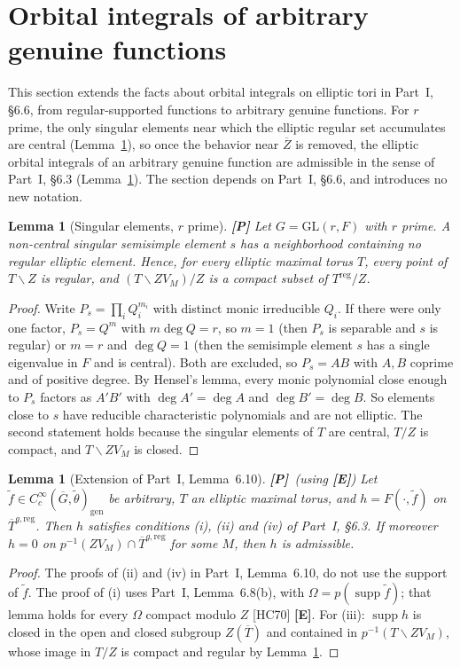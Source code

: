 \documentclass[12pt]{article}
\newcommand{\ov}[1]{\overline{#1}}
\newcommand{\gen}{\mathrm{gen}}
\newcommand{\reg}{\mathrm{reg}}
\newcommand{\supp}{\operatorname{supp}}
\newcommand{\GL}{\mathrm{GL}}
\newcommand{\Gb}{\ov{G}}
\newcommand{\Zb}{\ov{Z}}
\newcommand{\Tb}{\ov{T}}
\newcommand{\Pv}{\textbf{[P]}}
\newcommand{\Ev}{\textbf{[E]}}
\theoremstyle{plain}
\newtheorem{lemma}[theorem]{Lemma}
\theoremstyle{definition}
\begin{document}
\section{Orbital integrals of arbitrary genuine functions}\label{sec:arbitrary}
This section extends the facts about orbital integrals on elliptic tori in Part~I, \S6.6, from regular-supported functions to arbitrary genuine functions. For $r$ prime, the only singular elements near which the elliptic regular set accumulates are central (Lemma~\ref{lem:singular}), so once the behavior near $\Zb$ is removed, the elliptic orbital integrals of an arbitrary genuine function are admissible in the sense of Part~I, \S6.3 (Lemma~\ref{lem:Aext}). The section depends on Part~I, \S6.6, and introduces no new notation.

\begin{lemma}[Singular elements, $r$ prime]\label{lem:singular}\Pv
Let $G=\GL(r,F)$ with $r$ prime. A non-central singular semisimple element $s$ has a neighborhood containing no regular elliptic element. Hence, for every elliptic maximal torus $T$, every point of $T\smallsetminus Z$ is regular, and $(T\smallsetminus ZV_M)/Z$ is a compact subset of $T^{\reg}/Z$.
\end{lemma}
\begin{proof}
Write $P_s=\prod_iQ_i^{m_i}$ with distinct monic irreducible $Q_i$. If there were only one factor, $P_s=Q^m$ with $m\deg Q=r$, so $m=1$ (then $P_s$ is separable and $s$ is regular) or $m=r$ and $\deg Q=1$ (then the semisimple element $s$ has a single eigenvalue in $F$ and is central). Both are excluded, so $P_s=AB$ with $A,B$ coprime and of positive degree. By Hensel's lemma, every monic polynomial close enough to $P_s$ factors as $A'B'$ with $\deg A'=\deg A$ and $\deg B'=\deg B$. So elements close to $s$ have reducible characteristic polynomials and are not elliptic. The second statement holds because the singular elements of $T$ are central, $T/Z$ is compact, and $T\smallsetminus ZV_M$ is closed.
\end{proof}

\begin{lemma}[Extension of Part~I, Lemma~6.10]\label{lem:Aext}\Pv\ (using \Ev)
Let $\tilde f\in C_c^\infty(\Gb,\tilde\theta)_\gen$ be arbitrary, $T$ an elliptic maximal torus, and $h=F(\cdot,\tilde f)$ on $\Tb^{g,\reg}$. Then $h$ satisfies conditions (i), (ii) and (iv) of Part~I, \S6.3. If moreover $h=0$ on $p^{-1}(ZV_M)\cap\Tb^{g,\reg}$ for some $M$, then $h$ is admissible.
\end{lemma}
\begin{proof}
The proofs of (ii) and (iv) in Part~I, Lemma~6.10, do not use the support of $\tilde f$. The proof of (i) uses Part~I, Lemma~6.8(b), with $\Omega=p(\supp\tilde f)$; that lemma holds for every $\Omega$ compact modulo $Z$ [HC70] \Ev. For (iii): $\supp h$ is closed in the open and closed subgroup $Z(\Tb)$ and contained in $p^{-1}(T\smallsetminus ZV_M)$, whose image in $T/Z$ is compact and regular by Lemma~\ref{lem:singular}.
\end{proof}
\end{document}
